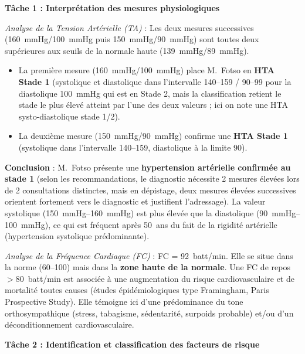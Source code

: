 \documentclass[11pt]{article}
\newcommand{\cle}[1]{{\popxbold\color{popdark}#1}}
\newcounter{popsec}
\newcounter{popsub}
\newcommand{\courssub}[1]{%
  \stepcounter{popsub}%
  \par\vspace{9pt}\noindent{\popxbold\fontsize{11.5}{13}\selectfont\color{popink}{\color{poporange}\thepopsec.\thepopsub}\hspace{6pt}#1}\par\nopagebreak\vspace{4pt}
}
\begin{document}
\courssub{Démarche et corrigé commenté}
\begin{exoresolu}
\textbf{Tâche 1 : Interprétation des mesures physiologiques}

\textit{Analyse de la Tension Artérielle (TA)} :
Les deux mesures successives (\SI{160}{\mmHg}/\SI{100}{\mmHg} puis \SI{150}{\mmHg}/\SI{90}{\mmHg}) sont toutes deux supérieures aux seuils de la normale haute (\SI{139}{\mmHg}/\SI{89}{\mmHg}).
\begin{itemize}
    \item La première mesure (\SI{160}{\mmHg}/\SI{100}{\mmHg}) place M.~Fotso en \textbf{HTA Stade 1} (systolique et diastolique dans l'intervalle 140--159 / 90--99 pour la diastolique \SI{100}{\mmHg} qui est en Stade 2, mais la classification retient le stade le plus élevé atteint par l'une des deux valeurs ; ici on note une HTA systo-diastolique stade 1/2).
    \item La deuxième mesure (\SI{150}{\mmHg}/\SI{90}{\mmHg}) confirme une \textbf{HTA Stade 1} (systolique dans l'intervalle 140--159, diastolique à la limite 90).
\end{itemize}
\textbf{Conclusion} : M.~Fotso présente une \textbf{hypertension artérielle confirmée au stade 1} (selon les recommandations, le diagnostic nécessite 2 mesures élevées lors de 2 consultations distinctes, mais en dépistage, deux mesures élevées successives orientent fortement vers le diagnostic et justifient l'adressage). La valeur systolique (\SIrange{150}{160}{\mmHg}) est plus élevée que la diastolique (\SIrange{90}{100}{\mmHg}), ce qui est fréquent après 50~ans du fait de la rigidité artérielle (\cle{hypertension systolique prédominante}).

\textit{Analyse de la Fréquence Cardiaque (FC)} :
FC = \SI{92}{batt/min}. Elle se situe dans la norme (60--100) mais dans la \textbf{zone haute de la normale}. Une FC de repos $> 80$~batt/min est associée à une augmentation du risque cardiovasculaire et de mortalité toutes causes (études épidémiologiques type Framingham, Paris Prospective Study). Elle témoigne ici d'une \cle{prédominance du tone orthosympathique} (stress, tabagisme, sédentarité, surpoids probable) et/ou d'un déconditionnement cardiovasculaire.

\vspace{0.5cm}
\textbf{Tâche 2 : Identification et classification des facteurs de risque}


\end{exoresolu}
\end{document}
